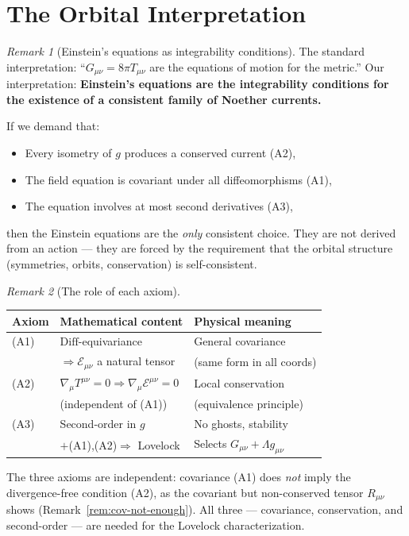 \documentclass[11pt,twocolumn]{article}
\theoremstyle{plain}\newtheorem{theorem}{Theorem}\newtheorem{proposition}[theorem]{Proposition}\newtheorem{corollary}[theorem]{Corollary}\newtheorem{lemma}[theorem]{Lemma}
\theoremstyle{definition}\newtheorem{definition}[theorem]{Definition}
\theoremstyle{remark}\newtheorem{remark}[theorem]{Remark}
\newcommand{\Diff}{\mathrm{Diff}}
\begin{document}
\section{The Orbital Interpretation}
\label{sec:interpretation}

\begin{remark}[Einstein's equations as integrability conditions]
The standard interpretation: ``$G_{\mu\nu} = 8\pi T_{\mu\nu}$ are the equations of motion for the metric.'' Our interpretation: \textbf{Einstein's equations are the integrability conditions for the existence of a consistent family of Noether currents.}

If we demand that:
\begin{itemize}
    \item Every isometry of $g$ produces a conserved current (A2),
    \item The field equation is covariant under all diffeomorphisms (A1),
    \item The equation involves at most second derivatives (A3),
\end{itemize}
then the Einstein equations are the \emph{only} consistent choice. They are not derived from an action --- they are forced by the requirement that the orbital structure (symmetries, orbits, conservation) is self-consistent.
\end{remark}

\begin{remark}[The role of each axiom]
\begin{center}\small
\begin{tabular}{lll}\toprule
\textbf{Axiom} & \textbf{Mathematical content} & \textbf{Physical meaning} \\\midrule
(A1) & $\Diff$-equivariance & General covariance \\
& $\Rightarrow \mathcal{E}_{\mu\nu}$ a natural tensor & (same form in all coords) \\
(A2) & $\nabla_\mu T^{\mu\nu}=0 \Rightarrow \nabla_\mu\mathcal{E}^{\mu\nu}=0$ & Local conservation \\
& (independent of (A1)) & (equivalence principle) \\
(A3) & Second-order in $g$ & No ghosts, stability \\
& $+$(A1),(A2)$\Rightarrow$ Lovelock & Selects $G_{\mu\nu} + \Lambda g_{\mu\nu}$ \\
\bottomrule
\end{tabular}
\end{center}
The three axioms are independent: covariance (A1) does \emph{not} imply the divergence-free condition (A2), as the covariant but non-conserved tensor $R_{\mu\nu}$ shows (Remark~\ref{rem:cov-not-enough}). All three --- covariance, conservation, and second-order --- are needed for the Lovelock characterization.
\end{remark}
\end{document}
